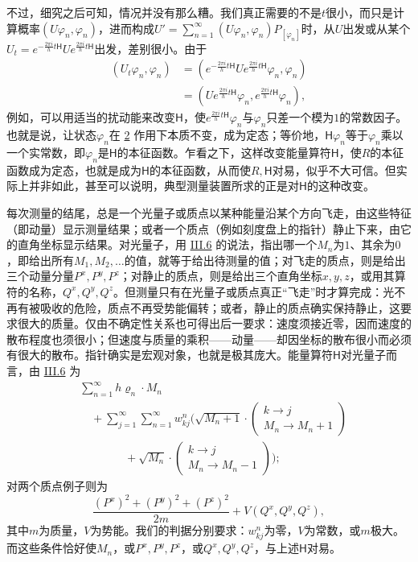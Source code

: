 \documentclass[fontsize=13pt,twoside,openany,headings=normal,parskip=false,bookmarkpackage=false,DIV=calc]{scrbook}
\begin{document}
\hypertarget{origpage-189}{}\label{origpage-189}不过，细究之后可知，情况并没有那么糟。我们真正需要的不是$t$很小，而只是计算概率$(U\varphi_n,\allowbreak \varphi_n)$，进而构成$U'=\sum_{n=1}^{\infty}(U\varphi_n,\allowbreak \varphi_n)P_{[\varphi_n]}$时，从$U$出发或从某个$U_t=e^{-\frac{2\pi i}{h}t\mathsf{H}}Ue^{\frac{2\pi i}{h}t\mathsf{H}}$出发，差别很小。由于
\begin{align*}
(U_t\varphi_n,\varphi_n)
&=\left(e^{-\frac{2\pi i}{h}t\mathsf{H}}Ue^{\frac{2\pi i}{h}t\mathsf{H}}\varphi_n,\varphi_n\right)\\
&=\left(Ue^{\frac{2\pi i}{h}t\mathsf{H}}\varphi_n,e^{\frac{2\pi i}{h}t\mathsf{H}}\varphi_n\right),
\end{align*}
例如，可以用适当的扰动能来改变$\mathsf{H}$，使$e^{\frac{2\pi i}{h}t\mathsf{H}}\varphi_n$与$\varphi_n$只差一个模为$1$的常数因子。也就是说，让状态$\varphi_n$在 \hyperref[eq:V.1.2]{2} 作用下本质不变，成为定态；等价地，$\mathsf{H}\varphi_n$等于$\varphi_n$乘以一个实常数，即$\varphi_n$是$\mathsf{H}$的本征函数。乍看之下，这样改变能量算符$\mathsf{H}$，使$R$的本征函数成为定态，也就是成为$\mathsf{H}$的本征函数，从而使$R,\allowbreak \mathsf{H}$对易，似乎不大可信。但实际上并非如此，甚至可以说明，典型测量装置所求的正是对$\mathsf{H}$的这种改变。

每次测量的结尾，总是一个光量子或质点以某种能量沿某个方向飞走，由这些特征（即动量）显示测量结果；或者一个质点（例如刻度盘上的指针）静止下来，由它的直角坐标显示结果。对光量子，用 \hyperref[sec:III.6]{III.6} 的说法，指出哪一个$M_n$为$1$、其余为$0$，即给出所有$M_1,\allowbreak M_2,\allowbreak \ldots$的值，就等于给出待测量的值；对飞走的质点，则是给出三个动量分量$P^x,\allowbreak P^y,\allowbreak P^z$；对静止的质点，则是给出三个直角坐标$x,\allowbreak y,\allowbreak z$，或用其算符的名称，$Q^x,\allowbreak Q^y,\allowbreak Q^z$。但测量只有在光量子或质点真正“飞走”时才算完成：光不再有被吸收的危险，质点不再受势能偏转；或者，静止的质点确实保持静止，这要求很大的质量。仅由不确定性关系也可得出后一要求：速度须接近零，因而速度的散布程度也须很小；但速度与质量的乘积——动量——却因坐标的散布很小而必须有很大的散布。指针确实是宏观对象，也就是极其庞大。能量算符$\mathsf{H}$对\hypertarget{origpage-190}{}\label{origpage-190}光量子而言，由 \hyperref[sec:III.6]{III.6} 为
\begin{align*}
&\sum_{n=1}^{\infty}h\varrho_n\cdot M_n\\
&\quad+\sum_{j=1}^{\infty}\sum_{n=1}^{\infty}w_{kj}^{n}
\Biggl(\sqrt{M_n+1}\cdot\begin{pmatrix}k\to j\\M_n\to M_n+1\end{pmatrix}\\
&\qquad\qquad{}+\sqrt{M_n}\cdot\begin{pmatrix}k\to j\\M_n\to M_n-1\end{pmatrix}\Biggr);
\end{align*}
对两个质点例子则为
\[
\frac{(P^x)^2+(P^y)^2+(P^z)^2}{2m}+V(Q^x,Q^y,Q^z),
\]
其中$m$为质量，$V$为势能。我们的判据分别要求：$w_{kj}^n$为零，$V$为常数，或$m$极大。而这些条件恰好使$M_n$，或$P^x,\allowbreak P^y,\allowbreak P^z$，或$Q^x,\allowbreak Q^y,\allowbreak Q^z$，与上述$\mathsf{H}$对易。
\end{document}
